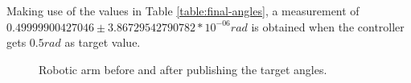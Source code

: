 \documentclass[12pt,oneside]{article}
\begin{document}
Making use of the values in Table \ref{table:final-angles}, a measurement of \\
$0.49999900427046 \pm 3.86729542790782 * 10^{-06} rad$ is obtained when the controller gets $0.5 rad$ as target value.
\begin{figure}[H]
  \centering
  \hfill
  \caption{Robotic arm before and after publishing the target angles.}
\end{figure}
\end{document}
